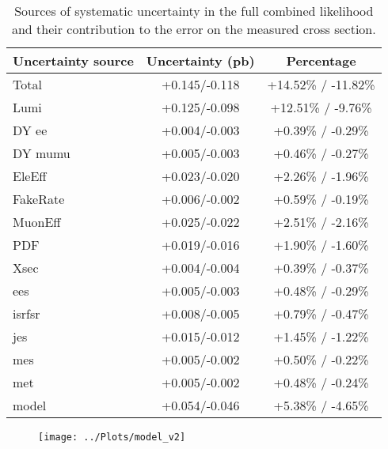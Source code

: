 \documentclass[11pt]{article}
\begin{document}
\begin{table}[htbp]
  \begin{center}
    \begin{tabular}{|l|c|c|} \hline
      Uncertainty source & Uncertainty (pb) & Percentage \\
      \hline
      \hline
      Total & +0.145/-0.118 & +14.52\% / -11.82\% \\
      \hline
      Lumi &  +0.125/-0.098 & +12.51\% / -9.76\% \\
      DY ee &  +0.004/-0.003 & +0.39\% / -0.29\% \\
      DY mumu & +0.005/-0.003 & +0.46\% / -0.27\% \\
      EleEff &  +0.023/-0.020 & +2.26\% / -1.96\% \\
      FakeRate & +0.006/-0.002 & +0.59\% / -0.19\% \\
      MuonEff & +0.025/-0.022 & +2.51\% / -2.16\% \\
      PDF & +0.019/-0.016 & +1.90\% / -1.60\% \\
      Xsec & +0.004/-0.004 & +0.39\% / -0.37\% \\
      ees & +0.005/-0.003 & +0.48\% / -0.29\% \\
      isrfsr & +0.008/-0.005 & +0.79\% / -0.47\% \\
      jes & +0.015/-0.012 & +1.45\% / -1.22\% \\
      mes & +0.005/-0.002 & +0.50\% / -0.22\% \\
      met & +0.005/-0.002 & +0.48\% / -0.24\% \\
      model &  +0.054/-0.046 & +5.38\% / -4.65\% \\
      \hline
    \end{tabular}
  \end{center}
  \caption{\label{tab:importantSystematics}
    Sources of systematic uncertainty in the full combined likelihood 
    and their contribution to the error on the measured cross section.
  }
\end{table}





\begin{figure}[htbp]
  \begin{center}
    \texttt{[image: ../Plots/model\_v2]}
  \end{center}
\end{figure}
\clearpage
\newpage
    
\end{document}
